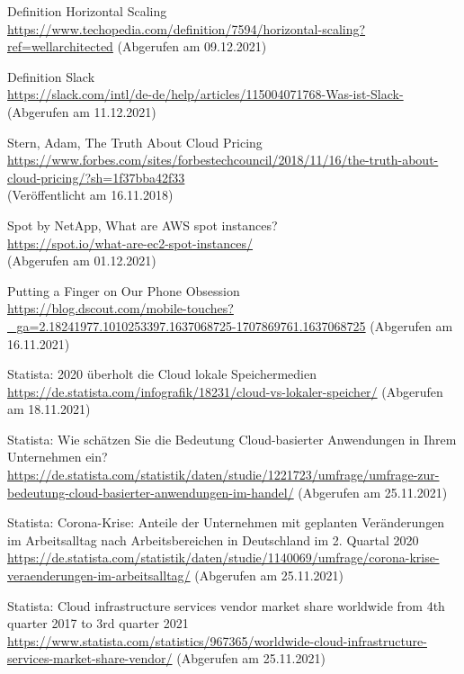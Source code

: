 \begin{thebibliography}{HR08}
   Definition Horizontal Scaling\\
 \url{https://www.techopedia.com/definition/7594/horizontal-scaling?ref=wellarchitected}
 (Abgerufen am 09.12.2021)

  Definition Slack\\
 \url{https://slack.com/intl/de-de/help/articles/115004071768-Was-ist-Slack-}
 (Abgerufen am 11.12.2021)

  Stern, Adam, The Truth About Cloud Pricing \\
  \url{https://www.forbes.com/sites/forbestechcouncil/2018/11/16/the-truth-about-cloud-pricing/?sh=1f37bba42f33}\\
  (Veröffentlicht am 16.11.2018)

 Spot by NetApp, What are AWS spot instances?\\
  \url{https://spot.io/what-are-ec2-spot-instances/}\\
  (Abgerufen am 01.12.2021)
  
    Putting a Finger on Our Phone Obsession\\
 \url{https://blog.dscout.com/mobile-touches?_ga=2.18241977.1010253397.1637068725-1707869761.1637068725}
 (Abgerufen am 16.11.2021)

    Statista: 2020 überholt die Cloud lokale Speichermedien\\
 \url{https://de.statista.com/infografik/18231/cloud-vs-lokaler-speicher/}
 (Abgerufen am 18.11.2021)

    Statista: Wie schätzen Sie die Bedeutung Cloud-basierter Anwendungen in Ihrem Unternehmen ein?\\
 \url{https://de.statista.com/statistik/daten/studie/1221723/umfrage/umfrage-zur-bedeutung-cloud-basierter-anwendungen-im-handel/}
 (Abgerufen am 25.11.2021) 
  
    Statista: Corona-Krise: Anteile der Unternehmen mit geplanten Veränderungen im Arbeitsalltag nach Arbeitsbereichen in Deutschland im 2. Quartal 2020\\
 \url{https://de.statista.com/statistik/daten/studie/1140069/umfrage/corona-krise-veraenderungen-im-arbeitsalltag/}
 (Abgerufen am 25.11.2021) 
   
   Statista: Cloud infrastructure services vendor market share worldwide from 4th quarter 2017 to 3rd quarter 2021\\
 \url{https://www.statista.com/statistics/967365/worldwide-cloud-infrastructure-services-market-share-vendor/}
 (Abgerufen am 25.11.2021) 
  

\end{thebibliography}
